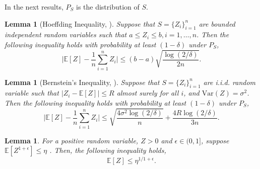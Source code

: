 \documentclass{article}
\theoremstyle{plain}
\theoremstyle{plain}
\newtheorem{lemma}[theorem]{Lemma}
\theoremstyle{definition}
\theoremstyle{remark}
\newcommand{\var}{\mathrm{Var}}
\newcommand{\mbE}{\mathbb{E}}
\begin{document}
In the next results, $P_S$ is the distribution of $S$.

\begin{lemma}[Hoeffding Inequality, \citealp{boucheron2013concentration}]\label{lem:hoeffding}
    Suppose that $S=\{Z_i\}_{i=1}^n$ are bounded independent random variables such that $a\leq Z_i\leq b, i=1, \ldots, n$. Then the following inequality holds with probability at least $(1-\delta)$ under 
    $P_S$,
\begin{equation}
    \Big|\mbE[Z]-\frac{1}{n}\sum_{i=1}^n Z_i\Big| \leq (b-a)\sqrt{\frac{\log(2/\delta)}{2n}}.
\end{equation}
\end{lemma}

\begin{lemma}[Bernstein's Inequality, \citealp{boucheron2013concentration}]\label{lem:bernstein}
    Suppose that $S=\{Z_i\}_{i=1}^n$ are i.i.d. random variable such that  $| Z_i-\mbE[Z]|\leq R$ almost surely for all $i$, and $\var(Z)=\sigma^2$. Then the following inequality holds with probability at least $(1-\delta)$ under %
    $P_S$,
\begin{equation}
    \Big|\mbE[Z]-\frac{1}{n}\sum_{i=1}^n Z_i\Big| \leq \sqrt{\frac{4\sigma^2\log(2/\delta)}{n}}+\frac{4R\log(2/\delta)}{3n}.
\end{equation}
\end{lemma}

\begin{lemma}\label{lem:jensen-power}
    For a positive random variable, $Z>0$ and $\epsilon\in(0,1]$, suppose $\mbE[Z^{1+\epsilon}] \leq \eta$ . Then, the following inequality  holds,
    \begin{equation*}
        \mbE[Z] \leq \eta^{1/{1+\epsilon}}.
    \end{equation*}
\end{lemma}
\end{document}
